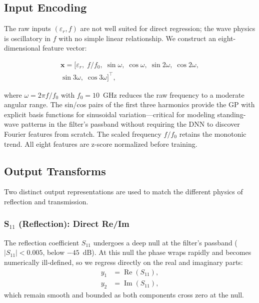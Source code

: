 \documentclass[conference]{IEEEtran}
\begin{document}
\subsection{Input Encoding}

The raw inputs $(\varepsilon_r, f)$ are not well suited for direct regression; the wave physics is oscillatory in $f$ with no simple linear relationship. We construct an eight-dimensional feature vector:

\begin{multline}\label{eq:features}
\mathbf{x} = \bigl[ \varepsilon_r,\; f/f_0,\;
    \sin\omega,\; \cos\omega,\;
    \sin 2\omega,\; \cos 2\omega,\\
    \sin 3\omega,\; \cos 3\omega \bigr]^\top,
\end{multline}

where $\omega = 2\pi f / f_0$ with $f_0 = 10$~GHz reduces the raw frequency to a moderate angular range. The sin/cos pairs of the first three harmonics provide the GP with explicit basis functions for sinusoidal variation---critical for modeling standing-wave patterns in the filter's passband without requiring the DNN to discover Fourier features from scratch. The scaled frequency $f/f_0$ retains the monotonic trend. All eight features are z-score normalized before training.

\subsection{Output Transforms}

Two distinct output representations are used to match the different physics of reflection and transmission.

\subsubsection{S$_{11}$ (Reflection): Direct Re/Im}
The reflection coefficient $S_{11}$ undergoes a deep null at the filter's passband ($|S_{11}| < 0.005$, below $-45$~dB). At this null the phase wraps rapidly and becomes numerically ill-defined, so we regress directly on the real and imaginary parts:
\begin{align}
y_1 &= \operatorname{Re}(S_{11}), \label{eq:s11re}\\
y_2 &= \operatorname{Im}(S_{11}), \label{eq:s11im}
\end{align}
which remain smooth and bounded as both components cross zero at the null.
\end{document}
